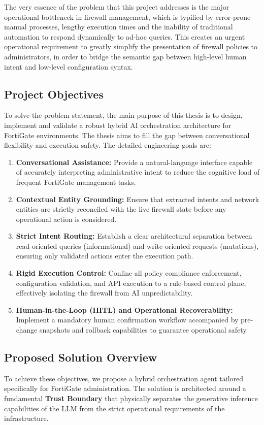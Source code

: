The very essence of the problem that this project addresses is the major operational bottleneck in firewall management, which is typified by error-prone manual processes, lengthy execution times and the inability of traditional automation to respond dynamically to ad-hoc queries.
This creates an urgent operational requirement to greatly simplify the presentation of firewall policies to administrators, in order to bridge the semantic gap between high-level human intent and low-level configuration syntax.

\subsection{Project Objectives}
To solve the problem statement, the main purpose of this thesis is to design, implement and validate a robust hybrid AI orchestration architecture for FortiGate environments. The thesis aims to fill the gap between conversational flexibility and execution safety. The detailed engineering goals are:

\begin{enumerate} 
    \item \textbf{Conversational Assistance:} Provide a natural-language interface capable of accurately interpreting administrative intent to reduce the cognitive load of frequent FortiGate management tasks.
    \item \textbf{Contextual Entity Grounding:} Ensure that extracted intents and network entities are strictly reconciled with the live firewall state before any operational action is considered.
    \item \textbf{Strict Intent Routing:} Establish a clear architectural separation between read-oriented queries (informational) and write-oriented requests (mutations), ensuring only validated actions enter the execution path.
    \item \textbf{Rigid Execution Control:} Confine all policy compliance enforcement, configuration validation, and API execution to a rule-based control plane, effectively isolating the firewall from AI unpredictability.
    \item \textbf{Human-in-the-Loop (HITL) and Operational Recoverability:} Implement a mandatory human confirmation workflow accompanied by pre-change snapshots and rollback capabilities to guarantee operational safety.
\end{enumerate}

\subsection{Proposed Solution Overview}
To achieve these objectives, we propose a hybrid orchestration agent tailored specifically for FortiGate administration. The solution is architected around a fundamental \textbf{Trust Boundary} that physically separates the generative inference capabilities of the LLM from the strict operational requirements of the infrastructure.

